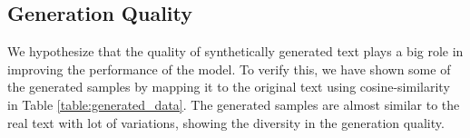 \documentclass[11pt]{article}
\begin{document}



\subsection{Generation Quality}
We hypothesize that the quality of synthetically generated text plays a big role in improving the performance of the model. To verify this, we have shown some of the generated samples by mapping it to the original text using cosine-similarity in Table \ref{table:generated_data}. The generated samples are almost similar to the real text with lot of variations, showing the diversity in the generation quality.
\end{document}
